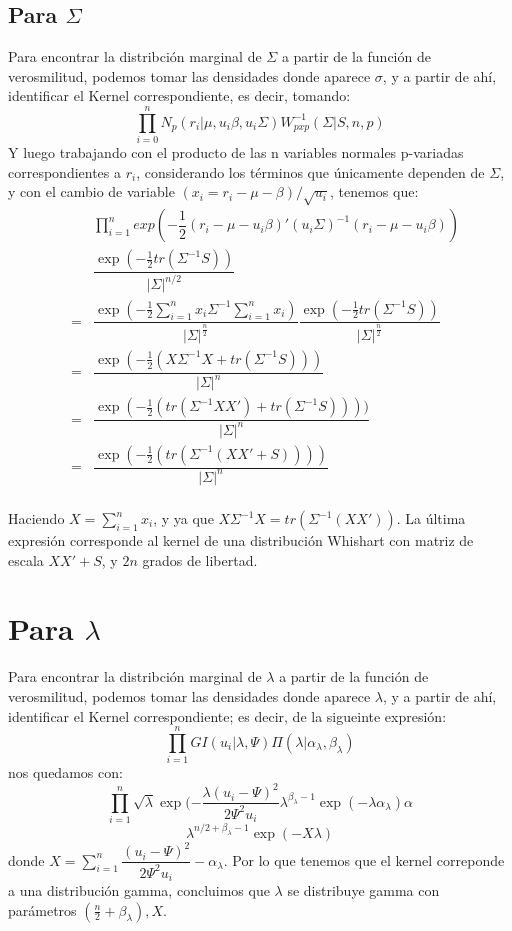 \subsection{Para $\Sigma$}
Para encontrar la distribción marginal de $\Sigma$ a partir de la función de verosmilitud, podemos tomar las densidades donde aparece $\sigma$, y a partir de ahí, identificar el Kernel correspondiente, es decir, tomando: 
\begin{equation*}
\prod_{i=0}^{n}N_{p}(r_{i}|\mu,u_{i}\beta,u_{i}\Sigma)W^{-1}_{pxp}(\Sigma|S,n,p)
\end{equation*}
Y luego trabajando con el producto de las n variables normales p-variadas correspondientes a $r_{i}$, considerando los términos que únicamente dependen de $\Sigma$, y con el cambio de variable $(x_{i}=r_{i}-\mu-\beta)/\sqrt{u_{i}}$, tenemos que:
\begin{eqnarray*}
& &\prod_{i=1}^{n}exp(-\dfrac{1}{2}(r_{i}-\mu-u_{i}\beta)'(u_{i}\Sigma)^{-1}(r_{i}-\mu-u_{i}\beta))\\
& &\dfrac{\exp(-\frac{1}{2}tr(\Sigma^{-1}S))}{|\Sigma|^{n/2}}\\
& =&\dfrac{\exp(-\frac{1}{2}\sum_{i=1}^{n}x_{i}\Sigma^{-1}\sum_{i=1}^{n}x_{i})}{|\Sigma|^{\frac{n}{2}}}\dfrac{\exp(-\frac{1}{2}tr(\Sigma^{-1}S))}{|\Sigma|^{\frac{n}{2}}}
 \\
& =&\dfrac{\exp(-\frac{1}{2}(X\Sigma^{-1}X + tr(\Sigma^{-1}S)))}{|\Sigma|^{n}} \\
& =&\dfrac{\exp(-\frac{1}{2}(tr(\Sigma^{-1}XX') + tr(\Sigma^{-1}S))))}{|\Sigma|^{n}}
 \\
& =&\dfrac{\exp(-\frac{1}{2}(tr(\Sigma^{-1}(XX' + S))))}{|\Sigma|^{n}}
 \\
\end{eqnarray*}

Haciendo $X=\sum_{i=1}^{n}x_{i}$, y ya que $X\Sigma^{-1}X=tr(\Sigma^{-1}(XX')) $. La última expresión corresponde al kernel de una distribución Whishart con matriz de escala $XX'+ S$, y $2n$ grados de libertad.
\section{Para $\lambda$}
Para encontrar la distribción marginal de $\lambda$ a partir de la función de verosmilitud, podemos tomar las densidades donde aparece $\lambda$, y a partir de ahí, identificar el Kernel correspondiente; es decir, de la sigueinte expresión:
\begin{equation*}
\prod_{i=1}^{n}GI(u_{i}|\lambda,\Psi)\Pi(\lambda|\alpha_{\lambda},\beta_{\lambda})
\end{equation*}
nos quedamos con:
\begin{equation*}
\prod_{i=1}^{n}\sqrt{\lambda}\exp(-\frac{\lambda(u_{i}-\Psi)^{2}}{2\Psi^{2}u_{i}}\lambda^{\beta_{\lambda}-1}\exp(-\lambda\alpha_{\lambda})\alpha
\end{equation*}
\begin{equation*}
\lambda^{n/2+\beta_{\lambda} -1}\exp(-X\lambda)
\end{equation*}
donde $X=\sum_{i=1}^{n}\dfrac{(u_{i}-\Psi)^{2}}{2\Psi^{2}u_{i}} - \alpha_{\lambda}$.
Por lo que tenemos que el kernel correponde a una distribución gamma, concluimos que $\lambda$ se distribuye gamma con parámetros $(\frac{n}{2}+\beta_{\lambda}),X$.

